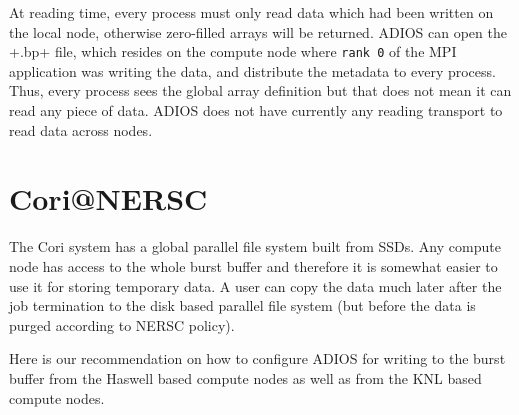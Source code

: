 At reading time, every process must only read data which had been written on the local node, otherwise zero-filled arrays will be returned. ADIOS can open the \vberb+.bp+ file, which resides on the compute node where \verb+rank 0+ of the MPI application was writing the data, and distribute the metadata to every process. Thus, every process sees the global array definition but that does not mean it can read any piece of data. ADIOS does not have currently any reading transport to read data across nodes. 


\section{Cori@NERSC}

The Cori system has a global parallel file system built from SSDs. Any compute node has access to the whole burst buffer and therefore it is somewhat easier to use it for storing temporary data. A user can copy the data much later after the job termination to the disk based parallel file system (but before the data is purged according to NERSC policy).

Here is our recommendation on how to configure ADIOS for writing to the burst buffer from the Haswell based compute nodes as well as from the KNL based compute nodes.





